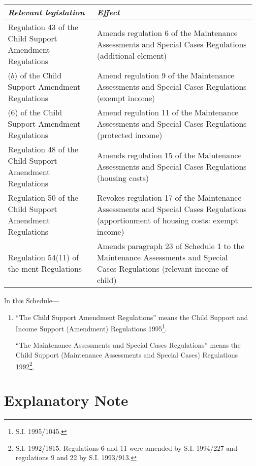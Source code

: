 \documentclass[12pt,a4paper]{article}
\begin{document}
\noindent
\begin{tabulary}{\linewidth}{JJ}
\hline
\itshape Relevant legislation & \itshape Effect\\
\hline
Regulation 43 of the Child Support Amendment Regulations&Amends regulation 6 of the Maintenance Assessments and Special Cases Regulations (additional element)\\
 ($b$) of the Child Support Amendment Regulations&Amend regulation 9 of the Maintenance Assessments and Special Cases Regulations (exempt income)\\
 (6) of the Child Support Amendment Regulations&Amend regulation 11 of the Maintenance Assessments and Special Cases Regulations (protected income)\\
Regulation 48 of the Child Support Amendment Regulations&Amends regulation 15 of the Maintenance Assessments and Special Cases Regulations (housing costs)\\
Regulation 50 of the Child Support Amendment Regulations&Revokes regulation 17 of the Maintenance Assessments and Special Cases Regulations (apportionment of housing costs: exempt income)\\
Regulation 54(11) of the ment Regulations&Amends paragraph 23 of Schedule 1 to the Maintenance Assessments and Special Cases Regulations (relevant income of child)\\
\hline
\end{tabulary}

In this Schedule—
\begin{enumerate}\item[]
“The Child Support Amendment Regulations” means the Child Support and Income Support (Amendment) Regulations 1995\footnote{\frenchspacing S.I. 1995/1045.}.

“The Maintenance Assessments and Special Cases Regulations” means the Child Support (Maintenance Assessments and Special Cases) Regulations 1992\footnote{\frenchspacing S.I. 1992/1815. Regulations 6 and 11 were amended by S.I. 1994/227 and regulations 9 and 22 by S.I. 1993/913.}.
\end{enumerate}


\part{Explanatory Note}

\renewcommand\parthead{--- Explanatory Note}
\end{document}
